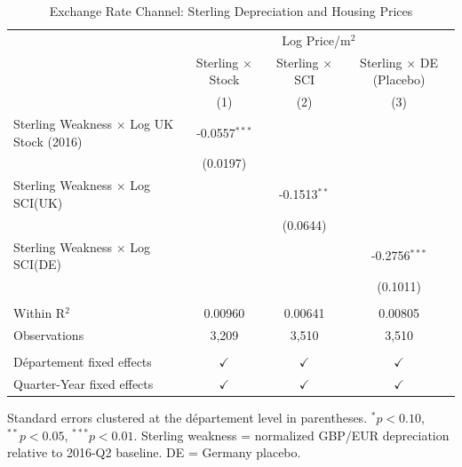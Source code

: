 
\begin{table}[htbp]
   \caption{\label{tab:exchange} Exchange Rate Channel: Sterling Depreciation and Housing Prices}
   \bigskip
   \centering
   \begin{tabular}{lccc}
      \toprule
       & \multicolumn{3}{c}{Log Price/m$^2$}\\
                                                      & Sterling $\times$ Stock  & Sterling $\times$ SCI  & Sterling $\times$ DE (Placebo) \\    
                                                      & (1)                      & (2)                    & (3)\\  
      \midrule 
      Sterling Weakness $\times$ Log UK Stock (2016)  & -0.0557$^{***}$          &                        &   \\   
                                                      & (0.0197)                 &                        &   \\   
      Sterling Weakness $\times$ Log SCI(UK)          &                          & -0.1513$^{**}$         &   \\   
                                                      &                          & (0.0644)               &   \\   
      Sterling Weakness $\times$ Log SCI(DE)          &                          &                        & -0.2756$^{***}$\\   
                                                      &                          &                        & (0.1011)\\   
       \\
      Within R$^2$                                    & 0.00960                  & 0.00641                & 0.00805\\  
      Observations                                    & 3,209                    & 3,510                  & 3,510\\  
       \\
      D\'epartement fixed effects                     & $\checkmark$             & $\checkmark$           & $\checkmark$\\   
      Quarter-Year fixed effects                      & $\checkmark$             & $\checkmark$           & $\checkmark$\\   
      \bottomrule
   \end{tabular}
\par\vspace{0.3em}\noindent\footnotesize Standard errors clustered at the d\'epartement level in parentheses. $^{*}p<0.10$, $^{**}p<0.05$, $^{***}p<0.01$. Sterling weakness = normalized GBP/EUR depreciation relative to 2016-Q2 baseline. DE = Germany placebo.
\end{table}


